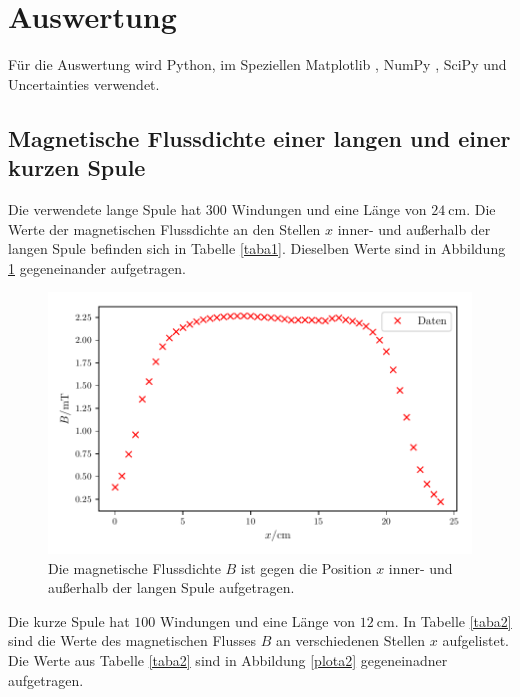 \section{Auswertung}
\label{sec:Auswertung}

Für die Auswertung wird Python, im Speziellen Matplotlib \cite{matplotlib}, NumPy \cite{numpy},
SciPy \cite{scipy} und Uncertainties \cite{uncertainties} verwendet.

\subsection{Magnetische Flussdichte einer langen und einer kurzen Spule}
Die verwendete lange Spule hat $\num{300}$ Windungen und eine Länge
von $\SI{24}{\centi\meter}$. %
Die Werte der magnetischen Flussdichte an den Stellen $x$ inner- und außerhalb
der langen Spule befinden sich in Tabelle \ref{taba1}.
Dieselben Werte sind in Abbildung \ref{plota1} gegeneinander aufgetragen.


\begin{figure}
    \centering
    \includegraphics{build/plota1.pdf}
    \caption{Die magnetische Flussdichte $B$ ist gegen die Position $x$ inner- 
    und außerhalb der langen Spule aufgetragen.}
    \label{plota1}
\end{figure}

\noindent 

\noindent Die kurze Spule hat $\num{100}$ Windungen und eine Länge von
$\SI{12}{\centi\meter}$. %
In Tabelle \ref{taba2} sind die Werte des magnetischen Flusses $B$
an verschiedenen Stellen $x$ aufgelistet.
Die Werte aus Tabelle \ref{taba2} sind in Abbildung \ref{plota2}
gegeneinadner aufgetragen.



